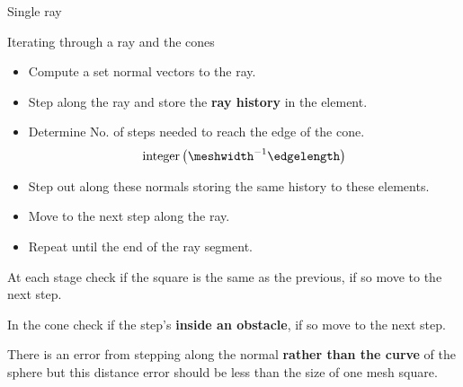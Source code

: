 \documentclass[8pt]{beamer}
\begin{document}
\begin{frame}{Single ray}
\begin{block}{Iterating through a ray and the cones}
\begin{multicols}{2}
\triangleonmesh
\vspace{-0.5cm}
\begin{itemize}
\item Compute a set normal vectors to the ray. 
\item Step along the ray and store the \textbf{ray history} in the element.
\item Determine No. of steps needed to reach the edge of the cone. 
\[
\text{integer}\left(\meshwidth^{-1}\edgelength\right)
\]
\item Step out along these normals storing the same history to these elements.
\item Move to the next step along the ray.
\item Repeat until the end of the ray segment.
\end{itemize}
\end{multicols}
\pause
At each stage check if the square is the same as the previous, if so move to the next step. 
\par In the cone check if the step's \textbf{inside an obstacle}, if so move to the next step.
\par
There is an error from stepping along the normal \textbf{rather than the curve} of the sphere but this distance error should be less than the size of one mesh square.
\end{block}
\end{frame}
\end{document}
